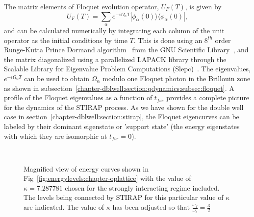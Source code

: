 The matrix elements of Floquet evolution operator, $U_F(T)$, is given by
\begin{equation}
U_F(T) = \sum_{\alpha} e^{-i\Omega_{\alpha}T}|\phi_{\alpha}(0)\rangle\langle \phi_{\alpha}(0)|,
\end{equation}
%
and can be calculated numerically by integrating each column of the unit operator as the initial conditions by time $T$. This is done using an $8^{th}$ order Runge-Kutta Prince Dormand algorithm~\cite{rkutta:pd} from the GNU Scientific Library~\cite{galassi:gsl}, and the matrix diagonalized using a parallelized LAPACK library through the Scalable Library for Eigenvalue Problem Computations (Slepc)~\cite{slepc}. The eigenvalues, $e^{-i\Omega_{\alpha}T}$ can be used to obtain $\Omega_{\alpha}$ modulo one Floquet photon in the Brillouin zone as shown in subsection~\ref{chapter-dblwell:section:qdynamics:subsec:floquet}. A profile of the Floquet eigenvalues as a function of $t_{fix}$ provides a complete picture for the dynamics of the STIRAP process. As we have shown for the double well case in section~\ref{chapter-dblwell:section:stirap}, the Floquet eigencurves can be labeled by their dominant eigenstate or 'support state' (the energy eigenstates with which they are isomorphic at $t_{fix}=0$).
\begin{figure} 
\ 
\caption{Magnified view of energy curves shown in Fig~\ref{fig:energylevels:chapter-oplattice} with the value of $\kappa=7.287781$ chosen for the strongly interacting regime included. The levels being connected by STIRAP for this particular value of $\kappa$ are indicated. The value of $\kappa$ has been adjusted so that $\frac{\omega_f}{\omega_s}=\frac{3}{2}$}
\label{fig:stirap:chapter-oplattice}
\end{figure}


